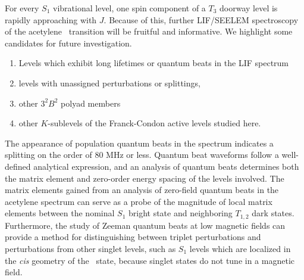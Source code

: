 For every $S_1$ vibrational level, one spin component of a $T_3$
doorway level is rapidly approaching with $J$.  Because of this,
further LIF/SEELEM spectroscopy of the acetylene \AtoX\ transition
will be fruitful and informative.  We highlight some candidates for
future investigation.
\begin{enumerate}
\item Levels which exhibit long lifetimes or quantum beats in the LIF
  spectrum
\item levels with unassigned perturbations or splittings,
\item other $3^2B^2$ polyad members
\item other $K$-sublevels of the Franck-Condon active levels studied
  here.  
\end{enumerate}

The appearance of population quantum beats in the spectrum indicates a
splitting on the order of 80 MHz or less.  Quantum beat waveforms
follow a well-defined analytical expression, and an analysis of
quantum beats determines both the matrix element and zero-order energy
spacing of the levels involved.  The matrix elements gained from an
analysis of zero-field quantum beats in the acetylene spectrum can
serve as a probe of the magnitude of local matrix elements between the
nominal $S_1$ bright state and neighboring $T_{1,2}$ dark states.
Furthermore, the study of Zeeman quantum beats at low magnetic fields
can provide a method for distinguishing between triplet perturbations
and perturbations from other singlet levels, such as $S_1$ levels
which are localized in the \emph{cis} geometry of the \astate\ state,
because singlet states do not tune in a magnetic field.

%  
% 
% 
